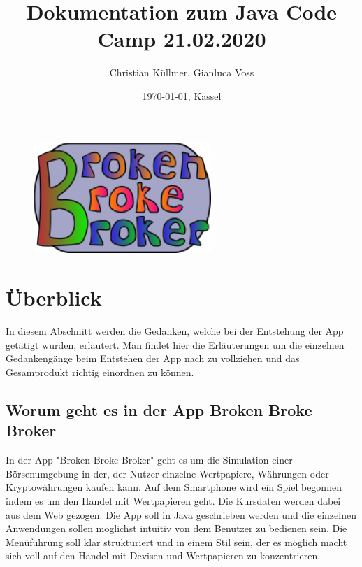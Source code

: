 \documentclass[10pt]{scrartcl}
\begin{document}
\title{Dokumentation zum Java Code Camp 21.02.2020}

\author{Christian Küllmer, Gianluca Voss}
\date{\today{}, Kassel}
\maketitle
\begin{figure}[H]
	\centering
	\includegraphics[width=0.6\textwidth]{Bilder/Titelblatt/big_logo.png}
\end{figure}
\newpage
\renewcommand{\contentsname}{Inhaltsverzeichnis}
\tableofcontents
\newpage

\section{Überblick}

In diesem Abschnitt werden die Gedanken, welche bei der Entstehung der App getätigt wurden, erläutert. Man findet hier die Erläuterungen um die einzelnen Gedankengänge beim Entstehen der App nach zu vollziehen und das Gesamprodukt richtig einordnen zu können.

\subsection{Worum geht es in der App Broken Broke Broker}
In der App "Broken Broke Broker" geht es um die Simulation einer Börsenumgebung in der, der Nutzer einzelne Wertpapiere, Währungen oder Kryptowährungen kaufen kann. Auf dem Smartphone wird ein Spiel begonnen indem es um den Handel mit Wertpapieren geht. Die Kursdaten werden dabei aus dem Web gezogen. Die App soll in Java geschrieben werden und die einzelnen Anwendungen sollen möglichst intuitiv von dem Benutzer zu bedienen sein. Die Menüführung soll klar strukturiert und in einem Stil sein, der es möglich macht sich voll auf den Handel mit Devisen und Wertpapieren zu konzentrieren.
\end{document}
